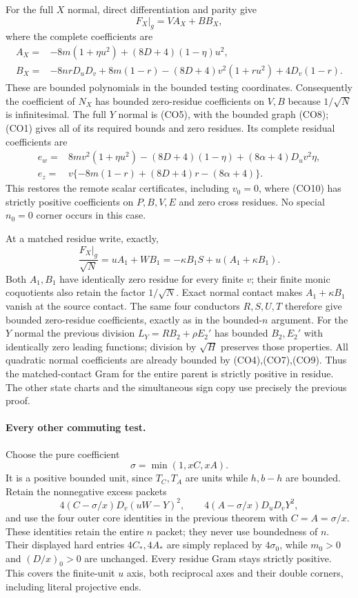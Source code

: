 For the full $X$ normal, direct differentiation and parity give
\[
 \left.F_X\right|_g=V A_X+B B_X,
\]
where the complete coefficients are
\begin{align*}
 A_X={}&-8m(1+\eta u^2)+(8D+4)(1-\eta)u^2,\\
 B_X={}&-8nrD_uD_v+8m(1-r)
       -(8D+4)v^2(1+ru^2)+4D_v(1-r).
\end{align*}
These are bounded polynomials in the bounded testing coordinates.
Consequently the coefficient of $\widehat N_X$ has bounded
zero-residue coefficients on $V,B$ because $1/\sqrt N$ is
infinitesimal.  The full $Y$ normal is (CO5), with the bounded
graph (CO8); (CO1) gives all of its required bounds and zero residues.
Its complete residual coefficients are
\begin{align*}
 e_w={}&8mv^2(1+\eta u^2)-(8D+4)(1-\eta)
                     +(8\alpha+4)D_uv^2\eta,\\
 e_z={}&v\{-8m(1-r)+(8D+4)r-(8\alpha+4)\}.
\end{align*}
This restores the remote scalar certificates, including $v_0=0$,
where (CO10) has strictly positive coefficients on $P,B,V,E$ and
zero cross residues.  No special $n_0=0$ corner occurs in this case.

At a matched residue write, exactly,
\[
 \frac{F_X|_g}{\sqrt N}=uA_1+WB_1
   =-\kappa B_1S+u(A_1+\kappa B_1).
\]
Both $A_1,B_1$ have identically zero residue for every finite $v$;
their finite monic coquotients also retain the factor $1/\sqrt N$.
Exact normal contact makes $A_1+\kappa B_1$ vanish at the source
contact.  The same four conductors $R,S,U,T$ therefore give bounded
zero-residue coefficients, exactly as in the bounded-$n$ argument.
For the $Y$ normal the previous division
$L_Y=RB_2+\rho E_2'$ has bounded $B_2,E_2'$ with identically zero
leading functions; division by $\sqrt H$ preserves those properties.
All quadratic normal coefficients are already bounded by
(CO4),(CO7),(CO9).  Thus the matched-contact Gram for the entire
parent is strictly positive in residue.  The other state charts and
the simultaneous sign copy use precisely the previous proof.

\paragraph{Every other commuting test.}
Choose the pure coefficient
\[
                         \sigma=\min(1,xC,xA).
\]
It is a positive bounded unit, since $T_C,T_A$ are units while
$h,b-h$ are bounded.  Retain the nonnegative excess packets
\[
 4(C-\sigma/x)D_v(uW-Y)^2,
 \qquad4(A-\sigma/x)D_uD_vY^2,
\]
and use the four outer core identities in the previous theorem with
$C=A=\sigma/x$.  These identities retain the entire $n$ packet;
they never use boundedness of $n$.  Their displayed hard entries
$4C_*,4A_*$ are simply replaced by $4\sigma_0$, while $m_0>0$
and $(D/x)_0>0$ are unchanged.  Every residue Gram stays strictly
positive.  This covers the finite-unit $u$ axis, both reciprocal
axes and their double corners, including literal projective ends.

